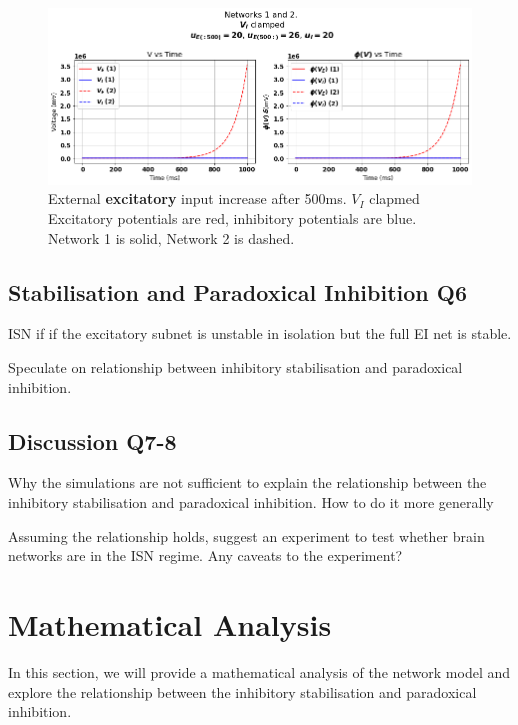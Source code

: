 \documentclass[10pt,twocolumn]{article}
\begin{document}
\begin{figure}
    \centering
    \captionsetup{justification=centering}
    \includegraphics[width=1\textwidth]{images/12-E_input_V_I_clamped.png}
    \caption{External \textbf{excitatory} input increase after 500ms. $V_I$ clapmed \\
        Excitatory potentials are red, inhibitory potentials are blue.\\
        Network 1 is solid, Network 2 is dashed.}
    \label{fig:e-input-clamped}
\end{figure}

\subsection{Stabilisation and Paradoxical Inhibition Q6}
ISN if if the excitatory subnet is unstable in isolation
but the full EI net is stable.

Speculate on relationship between inhibitory stabilisation
and paradoxical inhibition.

\subsection{Discussion Q7-8}
Why the simulations are not sufficient to explain
the relationship between the inhibitory stabilisation
and paradoxical inhibition. How to do it more generally

Assuming the relationship holds, suggest an experiment
to test whether brain networks are in the ISN regime.
Any caveats to the experiment?

\section{Mathematical Analysis}
In this section, we will provide a mathematical analysis
of the network model and explore the relationship between
the inhibitory stabilisation and paradoxical inhibition.
\end{document}
